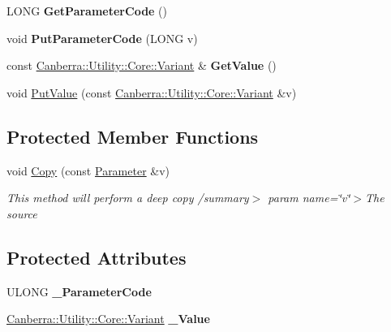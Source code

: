 \begin{DoxyCompactItemize}
\item 
\mbox{\label{class_canberra_1_1_data_types_1_1_application_1_1_parameter_aa009220bbe3def88ba5f3b82d766fb4b}} 
L\+O\+NG {\bfseries Get\+Parameter\+Code} ()
\item 
\mbox{\label{class_canberra_1_1_data_types_1_1_application_1_1_parameter_aefde68ded6f215013829d7eb12df979a}} 
void {\bfseries Put\+Parameter\+Code} (L\+O\+NG v)
\item 
\mbox{\label{class_canberra_1_1_data_types_1_1_application_1_1_parameter_ab8d5daf9e81b1796129277d4dc40336c}} 
const \hyperlink{class_canberra_1_1_utility_1_1_core_1_1_variant}{Canberra\+::\+Utility\+::\+Core\+::\+Variant} \& {\bfseries Get\+Value} ()
\item 
void \hyperlink{class_canberra_1_1_data_types_1_1_application_1_1_parameter_ad9c7e6dc5d9229c776441b8c04be489c_ad9c7e6dc5d9229c776441b8c04be489c}{Put\+Value} (const \hyperlink{class_canberra_1_1_utility_1_1_core_1_1_variant}{Canberra\+::\+Utility\+::\+Core\+::\+Variant} \&v)
\end{DoxyCompactItemize}
\subsection*{Protected Member Functions}
\begin{DoxyCompactItemize}
\item 
void \hyperlink{class_canberra_1_1_data_types_1_1_application_1_1_parameter_ada8595efa9f0042d73fc1a684bad0d81_ada8595efa9f0042d73fc1a684bad0d81}{Copy} (const \hyperlink{class_canberra_1_1_data_types_1_1_application_1_1_parameter}{Parameter} \&v)
\begin{DoxyCompactList}\small\item\em This method will perform a deep copy /summary$>$ param name=\char`\"{}v\char`\"{}$>$The source\end{DoxyCompactList}\end{DoxyCompactItemize}
\subsection*{Protected Attributes}
\begin{DoxyCompactItemize}
\item 
\mbox{\label{class_canberra_1_1_data_types_1_1_application_1_1_parameter_a36e4af63085101d30a389b402f29fcd2}} 
U\+L\+O\+NG {\bfseries \+\_\+\+Parameter\+Code}
\item 
\mbox{\label{class_canberra_1_1_data_types_1_1_application_1_1_parameter_a966ee03ee7cf211acb7a29eff895ea96}} 
\hyperlink{class_canberra_1_1_utility_1_1_core_1_1_variant}{Canberra\+::\+Utility\+::\+Core\+::\+Variant} {\bfseries \+\_\+\+Value}
\end{DoxyCompactItemize}
